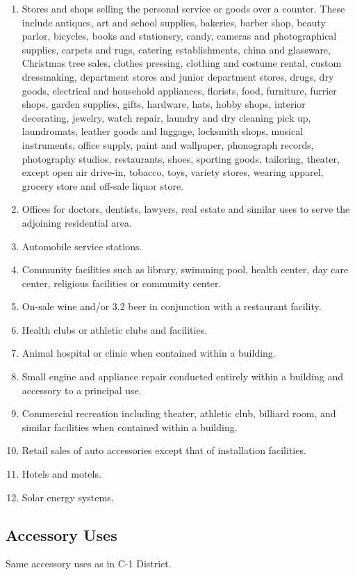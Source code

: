 \begin{enumerate}[{\indent}1)]
    \item Stores and shops selling the personal service or goods over a counter.  These include antiques, art and school supplies, bakeries, barber shop, beauty parlor, bicycles, books and stationery, candy, cameras and photographical supplies, carpets and rugs, catering establishments, china and glassware, Christmas tree sales, clothes pressing, clothing and costume rental, custom dressmaking, department stores and junior department stores, drugs, dry goods, electrical and household appliances, florists, food, furniture, furrier shops, garden supplies, gifts, hardware, hats, hobby shops, interior decorating, jewelry, watch repair, laundry and dry cleaning pick up, laundromats, leather goods and luggage, locksmith shops, musical instruments, office supply, paint and wallpaper, phonograph records, photography studios, restaurants, shoes, sporting goods, tailoring, theater, except open air drive-in, tobacco, toys, variety stores, wearing apparel, grocery store and off-sale liquor store.
    \item Offices for doctors, dentists, lawyers, real estate and similar uses to serve the adjoining residential area.
    \item Automobile service stations.
    \item Community facilities such as library, swimming pool, health center, day care center, religious facilities or community center.
    \item On-sale wine and/or 3.2 beer in conjunction with a restaurant facility.
    \item Health clubs or athletic clubs and facilities.
    \item Animal hospital or clinic when contained within a building.
    \item Small engine and appliance repair conducted entirely within a building and accessory to a principal use.
    \item Commercial recreation including theater, athletic club, billiard room, and similar facilities when contained within a building.
    \item Retail sales of auto accessories except that of installation facilities.
    \item Hotels and motels.  
    \item Solar energy systems.
\end{enumerate}
\subsection{Accessory Uses}
Same accessory uses as in C-1 District.
